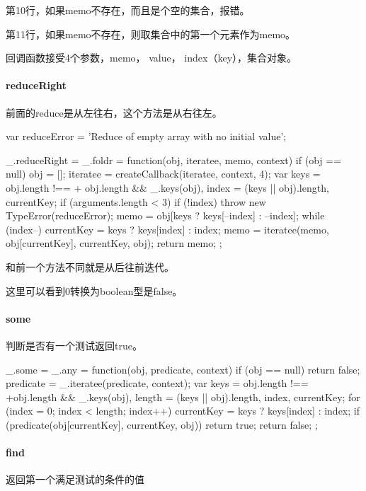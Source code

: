 第10行，如果memo不存在，而且是个空的集合，报错。

第11行，如果memo不存在，则取集合中的第一个元素作为memo。

回调函数接受4个参数，memo， value， index（key），集合对象。

\paragraph{reduceRight} 前面的reduce是从左往右，这个方法是从右往左。

\begin{JavaScript}
  var reduceError = 'Reduce of empty array with no initial value';	

  _.reduceRight = _.foldr = function(obj, iteratee, memo, context) {
    if (obj == null) obj = [];
    iteratee = createCallback(iteratee, context, 4);
    var keys = obj.length !== + obj.length && _.keys(obj),
        index = (keys || obj).length,
        currentKey;
    if (arguments.length < 3) {
      if (!index) throw new TypeError(reduceError);
      memo = obj[keys ? keys[--index] : --index];
    }
    while (index--) {
      currentKey = keys ? keys[index] : index;
      memo = iteratee(memo, obj[currentKey], currentKey, obj);
    }
    return memo;
  };
\end{JavaScript}

和前一个方法不同就是从后往前迭代。

这里可以看到0转换为boolean型是false。

\paragraph{some} 判断是否有一个测试返回true。

\begin{JavaScript}
  _.some = _.any = function(obj, predicate, context) {
    if (obj == null) return false;
    predicate = _.iteratee(predicate, context);
    var keys = obj.length !== +obj.length && _.keys(obj),
        length = (keys || obj).length,
        index, currentKey;
    for (index = 0; index < length; index++) {
      currentKey = keys ? keys[index] : index;
      if (predicate(obj[currentKey], currentKey, obj)) return true;
    }
    return false;
  };
\end{JavaScript}

\paragraph{find} 返回第一个满足测试的条件的值

